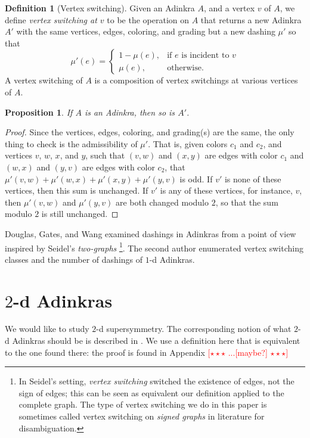 \documentclass[12pt,twoside,singlespace]{article}
\numberwithin{equation}{section}
\newtheorem{prop}[equation]{Proposition}
\theoremstyle{definition}
\newtheorem{definition}[equation]{Definition}
\newcommand{\com}[1]{\textcolor{red}{$[\star \star \star$ #1 $\star \star \star]$}}
\begin{document}
\begin{definition}[Vertex switching]
Given an Adinkra $A$, and a vertex $v$ of $A$, we define \emph{vertex switching at $v$} to be the operation on $A$ that returns a new Adinkra $A'$ with the same vertices, edges, coloring, and grading but a new dashing $\mu'$ so that
\begin{equation}
\mu'(e)=\begin{cases}
1-\mu(e),&\mbox{if $e$ is incident to $v$}\\
\mu(e),&\mbox{otherwise.}
\end{cases}
\end{equation}
A vertex switching of $A$ is a composition of vertex switchings at various vertices of $A$.
\end{definition}

\begin{prop}
\label{prop:switching-still-adinkra}
If $A$ is an Adinkra, then so is $A'$.
\end{prop}
\begin{proof}
Since the vertices, edges, coloring, and grading(s) are the same, the only thing to check is the admissibility of $\mu'$.  That is, given colors $c_1$ and $c_2$, and vertices $v$, $w$, $x$, and $y$, such that $(v,w)$ and $(x,y)$ are edges with color $c_1$ and $(w,x)$ and $(y,v)$ are edges with color $c_2$, that $\mu'(v,w)+\mu'(w,x)+\mu'(x,y)+\mu'(y,v)$ is odd.  If $v'$ is none of these vertices, then this sum is unchanged.  If $v'$ is any of these vertices, for instance, $v$, then $\mu'(v,w)$ and $\mu'(y,v)$ are both changed modulo $2$, so that the sum modulo $2$ is still unchanged.
\end{proof}

Douglas, Gates, and Wang \cite{douglas} examined dashings in Adinkras from a point of view inspired by Seidel's \emph{two-graphs} \cite{seidel:survey} \footnote{In Seidel's setting, \emph{vertex switching} switched the existence of edges, not the sign of edges; this can be seen as equivalent our definition applied to the complete graph. The type of vertex switching we do in this paper is sometimes called vertex switching on \emph{signed graphs} in literature for disambiguation.}. The second author \cite{zhang:adinkras} enumerated vertex switching classes and the number of dashings of $1$-d Adinkras.

\section{$2$-d Adinkras}
We would like to study $2$-d supersymmetry. The corresponding notion of what $2$-d Adinkras should be is described in \cite{gates:dimensional_extension,hubsch:weaving}.  We use a definition here that is equivalent to the one found there: the proof is found in Appendix \com{...[maybe?]}
\end{document}
